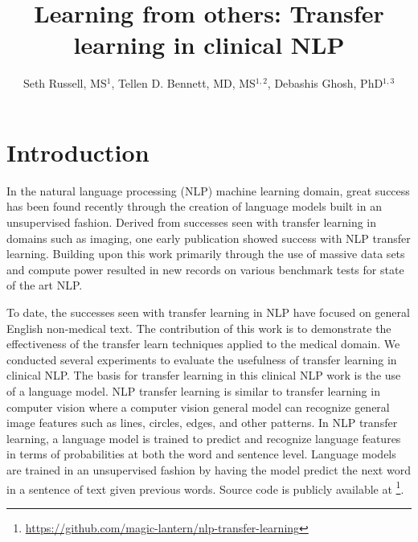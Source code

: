 \documentclass{amia}
\begin{document}
\title{Learning from others: Transfer learning in clinical NLP}

\author{Seth Russell, MS$^{1}$,
    Tellen D. Bennett, MD, MS$^{1,2}$,
    Debashis Ghosh, PhD$^{1,3}$}


\maketitle

\section*{Introduction}

In the natural language processing (NLP) machine learning domain, great success has been found recently through the creation of language models built in an unsupervised fashion. Derived from successes seen with transfer learning in domains such as imaging, one early publication \cite{howard_universal_2018} showed success with NLP transfer learning. Building upon this work primarily through the use of massive data sets and compute power \cite{radford_improving_2018,radford_language_2019} resulted in new records on various benchmark tests for state of the art NLP.

To date, the successes seen with transfer learning in NLP have focused on general English non-medical text. The contribution of this work is to demonstrate the effectiveness of the transfer learn techniques applied to the medical domain. We conducted several experiments to evaluate the usefulness of transfer learning in clinical NLP. The basis for transfer learning in this clinical NLP work is the use of a language model. NLP transfer learning is similar to transfer learning in computer vision where a computer vision general model can recognize general image features such as lines, circles, edges, and other patterns. In NLP transfer learning, a language model is trained to predict and recognize language features in terms of probabilities at both the word and sentence level. Language models are trained in an unsupervised fashion by having the model predict the next word in a sentence of text given previous words. Source code is publicly available at \footnote{\url{https://github.com/magic-lantern/nlp-transfer-learning}}.
\end{document}
